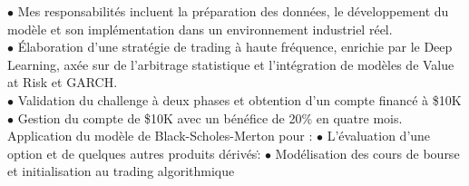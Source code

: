 \documentclass[theme]{cv_einstein}
\begin{document}
\begin{paracol}{2}
\begin{rightcolumn}
{             \;\;\;\;\;\;\;\;\;\;
             $\bullet$ Mes responsabilités incluent la préparation des données, le développement du modèle et son implémentation dans un environnement industriel réel.}
            \vspace{0.005cm}\\
            {$\bullet$ Élaboration d'une stratégie de trading à haute fréquence, enrichie par le Deep Learning, axée sur de l'arbitrage statistique et l'intégration de modèles de Value at Risk et GARCH.}
            \vspace{0.005cm}\\
            {$\bullet$ Validation du challenge à deux phases et obtention d'un compte financé à \$10K \: \:\:\: \:\:\: \:\:\: \:\:\: \:\:\: \:\:\: \:\:\: \:\:\: \:\:\: \:\:\: \:\:\: \:\:\: \:\:\: \:\:\: \:\:\: \:\:\: \:\:\: \:\:\: \:\:\: \:\:\: \:\:\: \:\:\: \:\:\: \:\:\: \:\:\: \:\:\: \:\:\: \:\:\: \:\:\: \:\:\: \:\:\: \:\:\: \:\:\: \:\:\: \:\:\: \:\:\: \:\: $\bullet$ Gestion du compte de \$10K avec un bénéfice de 20\% en quatre mois.}
            \vspace{0.005cm}\\
            {Application du modèle de Black-Scholes-Merton pour : \: \:\:\: \:\:\: \:\:\: \:\:\: \:\:\: \:\:\: \:\:\: \:\:\: \:\:\: \:\:\: \:\:\: \:\:\: \:\:\: \:\:\: \:\:\: \:\:\: \:\:\: \:\:\: \:\:\: \:\:\: \:\:\: \:\:\: \:\:\: \:\:\: \:\:\: \:\:\: \:\:\: \:\:\: \:\:\: \:\:\: \:\:\: \:\:\: \:\:\: \:\:\: \:\:\: \:\:\: \:\:
            $\bullet$ L'évaluation d'une option et de quelques autres produits dérivés:\.\: \:\: \:\:\: \:\:\: \:\:\: \:\:\: \:\:\: \:\:\: \:\:\: \:\:\: \:\:\: \:\:\: \:\:\: \:\:\: \:\:\: \:\:\: \:\:\: \:\:\: \:\:\: \:\:\: \:\:\: \:\:\: \:\:\: \:\:\: \:\:\: \:\:\: \:\:\: \:\:\: \:\:\: \:\:\: \:\:\: \:\:\: \:\:\: \:\:\: \:\:\: \:\:\: \:\:\: \:\: $\bullet$ Modélisation des cours de bourse et initialisation au trading algorithmique}
        \end{rightcolumn}
          
            
        

\end{paracol}
\end{document}
